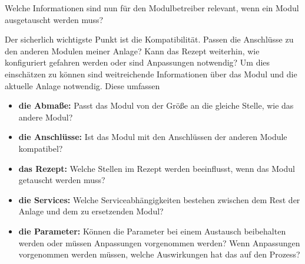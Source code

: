 Welche Informationen sind nun für den Modulbetreiber relevant, wenn ein Modul ausgetauscht werden muss?

Der sicherlich wichtigste Punkt ist die Kompatibilität. Passen die Anschlüsse zu den anderen Modulen meiner Anlage? Kann das Rezept weiterhin, wie konfiguriert gefahren werden oder sind Anpassungen notwendig? Um dies einschätzen zu können sind weitreichende Informationen über das Modul und die aktuelle Anlage notwendig. Diese umfassen
\begin{itemize}
\item \textbf{die Abmaße:} Passt das Modul von der Größe an die gleiche Stelle, wie das andere Modul?
\item \textbf{die Anschlüsse:} Ist das Modul mit den Anschlüssen der anderen Module kompatibel?
\item \textbf{das Rezept:} Welche Stellen im Rezept werden beeinflusst, wenn das Modul getauscht werden muss?
\item \textbf{die Services:} Welche Serviceabhängigkeiten bestehen zwischen dem Rest der Anlage und dem zu ersetzenden Modul?
\item \textbf{die Parameter:} Können die Parameter bei einem Austausch beibehalten werden oder müssen Anpassungen vorgenommen werden? Wenn Anpassungen vorgenommen werden müssen, welche Auswirkungen hat das auf den Prozess?
\end{itemize}

